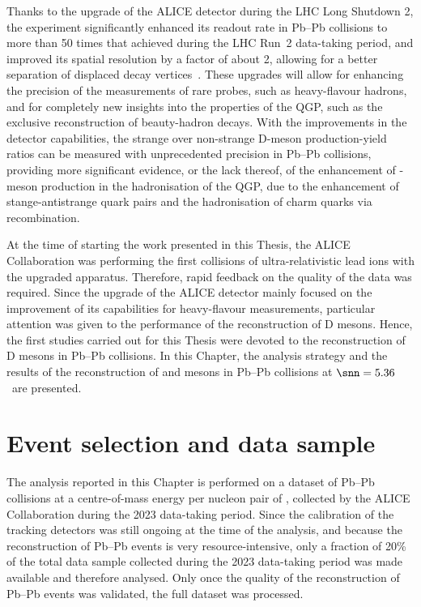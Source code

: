 Thanks to the upgrade of the ALICE detector during the LHC Long Shutdown 2, the experiment significantly enhanced its readout rate in Pb--Pb collisions to more than 50 times that achieved during the LHC Run~2 data-taking period, and improved its spatial resolution by a factor of about 2, allowing for a better separation of displaced decay vertices~\cite{ALICE:2023udb}. These upgrades will allow for enhancing the precision of the measurements of rare probes, such as heavy-flavour hadrons, and for completely new insights into the properties of the QGP, such as the exclusive reconstruction of beauty-hadron decays. With the improvements in the detector capabilities, the strange over non-strange D-meson production-yield ratios can be measured with unprecedented precision in Pb--Pb collisions, providing more significant evidence, or the lack thereof, of the enhancement of \ds-meson production in the hadronisation of the QGP, due to the enhancement of stange-antistrange quark pairs and the hadronisation of charm quarks via recombination.

At the time of starting the work presented in this Thesis, the ALICE Collaboration was performing the first collisions of ultra-relativistic lead ions with the upgraded apparatus. Therefore, rapid feedback on the quality of the data was required. Since the upgrade of the ALICE detector mainly focused on the improvement of its capabilities for heavy-flavour measurements, particular attention was given to the performance of the reconstruction of D mesons. Hence, the first studies carried out for this Thesis were devoted to the reconstruction of D mesons in Pb--Pb collisions. In this Chapter, the analysis strategy and the results of the reconstruction of \ds and \dpl mesons in Pb--Pb collisions at $\snn=5.36$~\tev are presented.

\section{Event selection and data sample}
The analysis reported in this Chapter is performed on a dataset of Pb--Pb collisions at a centre-of-mass energy per nucleon pair of \fivenn, collected by the ALICE Collaboration during the 2023 data-taking period. Since the calibration of the tracking detectors was still ongoing at the time of the analysis, and because the reconstruction of Pb--Pb events is very resource-intensive, only a fraction of 20\% of the total data sample collected during the 2023 data-taking period was made available and therefore analysed. Only once the quality of the reconstruction of Pb--Pb events was validated, the full dataset was processed.

